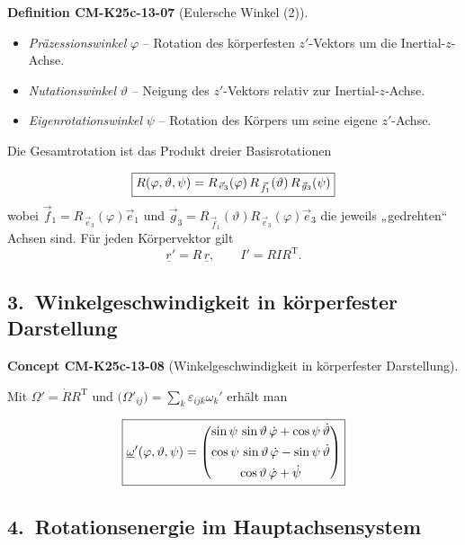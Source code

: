\documentclass[10pt, letterpaper]{article}
\newcommand{\CustomHeading}[3]{%
  \par\medskip\noindent%
  \textbf{#1 #2} \textnormal{(#3)}.\enskip%
}
\newenvironment{DEF}[2]{\begin{unitbox}\CustomHeading{Definition}{#1}{#2}}{\end{unitbox}}
\newenvironment{CONC}[2]{\begin{unitbox}\CustomHeading{Concept}{#1}{#2}}{\end{unitbox}}
\begin{document}
\begin{DEF}{CM-K25c-13-07}{Eulersche Winkel (2)}
\begin{itemize}
  \item \emph{Präzessionswinkel} $\varphi$  
        – Rotation des körperfesten $z'$-Vektors um die Inertial-$z$-Achse.
  \item \emph{Nutationswinkel} $\vartheta$  
        – Neigung des $z'$-Vektors relativ zur Inertial-$z$-Achse.
  \item \emph{Eigenrotationswinkel} $\psi$  
        – Rotation des Körpers um seine eigene $z'$-Achse.
\end{itemize}

Die Gesamtrotation ist das Produkt dreier Basisrotationen

\[
  \boxed{%
    R(\varphi,\vartheta,\psi)
    =R_{\,\vec e_3}(\varphi)\,
     R_{\,\vec f_1}(\vartheta)\,
     R_{\,\vec g_3}(\psi)
  }
\]
wobei $\vec f_1=R_{\,\vec e_3}(\varphi)\vec e_1$ und  
$\vec g_3=R_{\,\vec f_1}(\vartheta)R_{\,\vec e_3}(\varphi)\vec e_3$ die
jeweils „gedrehten“ Achsen sind.  
Für jeden Körpervektor gilt
\[
  \underline r' = R\,\underline r, 
  \qquad
  I'      = R I R^{\mathrm T}.
\]
\end{DEF}
\subsection*{3.\ Winkelgeschwindigkeit in körperfester Darstellung}

\begin{CONC}{CM-K25c-13-08}{Winkelgeschwindigkeit in körperfester Darstellung}
Mit $\Omega'=\dot R R^{\mathrm T}$ und
$\bigl(\Omega'_{ij}\bigr)=\sum_k\varepsilon_{ijk}\omega_k'$ erhält man

\[
  \boxed{%
    \underline{\omega}'(\varphi,\vartheta,\psi)
    =
    \begin{pmatrix}
      \sin\psi\,\sin\vartheta\,\dot\varphi
      +\cos\psi\,\dot\vartheta \\[4pt]
      \cos\psi\,\sin\vartheta\,\dot\varphi
      -\sin\psi\,\dot\vartheta \\[4pt]
      \cos\vartheta\,\dot\varphi+\dot\psi
    \end{pmatrix}}
\]
\end{CONC}

\subsection*{4.\ Rotationsenergie im Hauptachsensystem}
\end{document}
